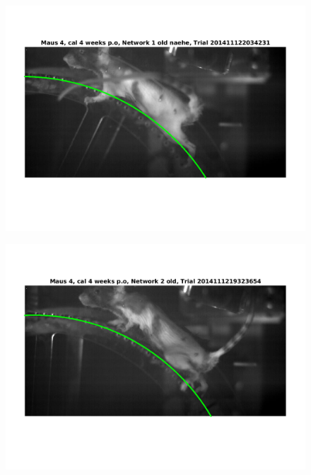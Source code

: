 \documentclass[
	fontsize=12pt,
	paper=a4,
	twoside=false,
	numbers=noenddot,
	plainheadsepline,
	toc=listof,
	toc=bibliography
]{scrartcl}
\begin{document}


\begin{figure} [htb] \centering
	\includegraphics[scale = 0.6]{images/mouse4/result_Maus_4_cal_4_weeks_Network_1_old_naehe.png}
\end{figure}
\begin{figure} [htb] \centering
	\includegraphics[scale = 0.6]{images/mouse4/result_Maus_4_cal_4_weeks_Network_2_old.png}
\end{figure}
\end{document}

